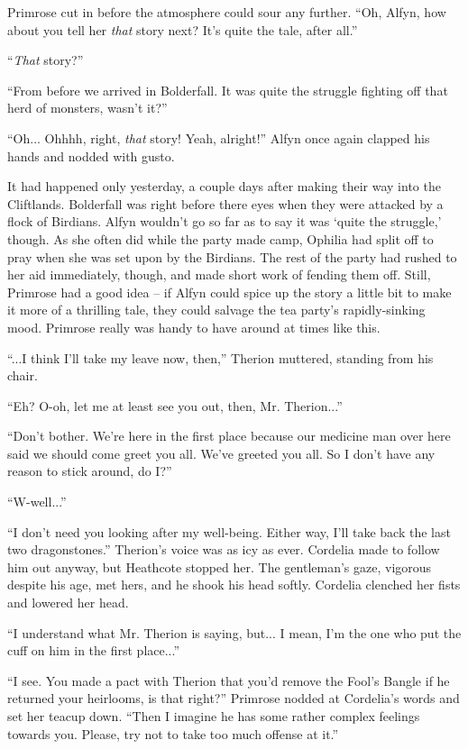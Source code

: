 Primrose cut in before the atmosphere could sour any further. ``Oh, Alfyn, how about you tell her \emph{that} story next? It's quite the tale, after all.''

``\emph{That} story?''

``From before we arrived in Bolderfall. It was quite the struggle fighting off that herd of monsters, wasn't it?''

``Oh... Ohhhh, right, \emph{that} story! Yeah, alright!'' Alfyn once again clapped his hands and nodded with gusto.

It had happened only yesterday, a couple days after making their way into the Cliftlands. Bolderfall was right before there eyes when they were attacked by a flock of Birdians. Alfyn wouldn't go so far as to say it was `quite the struggle,' though. As she often did while the party made camp, Ophilia had split off to pray when she was set upon by the Birdians. The rest of the party had rushed to her aid immediately, though, and made short work of fending them off. Still, Primrose had a good idea -- if Alfyn could spice up the story a little bit to make it more of a thrilling tale, they could salvage the tea party's rapidly-sinking mood. Primrose really was handy to have around at times like this.

``...I think I'll take my leave now, then,'' Therion muttered, standing from his chair.

``Eh? O-oh, let me at least see you out, then, Mr. Therion...''

``Don't bother. We're here in the first place because our medicine man over here said we should come greet you all. We've greeted you all. So I don't have any reason to stick around, do I?''

``W-well...''

``I don't need you looking after my well-being. Either way, I'll take back the last two dragonstones.'' Therion's voice was as icy as ever. Cordelia made to follow him out anyway, but Heathcote stopped her. The gentleman's gaze, vigorous despite his age, met hers, and he shook his head softly. Cordelia clenched her fists and lowered her head. 

``I understand what Mr. Therion is saying, but... I mean, I'm the one who put the cuff on him in the first place...''

``I see. You made a pact with Therion that you'd remove the Fool's Bangle if he returned your heirlooms, is that right?'' Primrose nodded at Cordelia's words and set her teacup down. ``Then I imagine he has some rather complex feelings towards you. Please, try not to take too much offense at it.''

